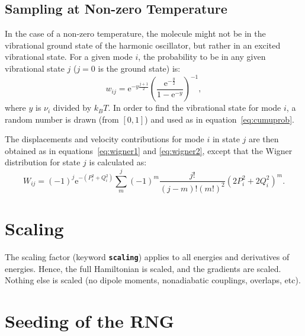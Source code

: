 \documentclass[a4paper,10pt,DIV=15,openany,twoside=false]{scrbook}
\newcommand{\todo}[1]{\textcolor{RL}{#1}}
\newcommand{\ttt}[1]{\textbf{\texttt{#1}}}
\newcommand{\E}{\ensuremath{\mathrm{e}}}
\begin{document}
\subsection{Sampling at Non-zero Temperature}


In the case of a non-zero temperature, the molecule might not be in the vibrational ground state of the harmonic oscillator, but rather in an excited vibrational state.
For a given mode $i$, the probability to be in any given vibrational state $j$ ($j=0$ is the ground state) is:
\begin{equation}
  w_{ij}=\E^{-y\frac{j+1}{2}}\left(\frac{\E^{-\frac{y}{2}}}{1-\E^{-y}}\right)^{-1},
\end{equation}
where $y$ is $\nu_i$ divided by $k_BT$.
In order to find the vibrational state for mode $i$, a random number is drawn (from $[0,1]$) and used as in equation~\eqref{eq:cumuprob}.

The displacements and velocity contributions for mode $i$ in state $j$ are then obtained as in equations~\eqref{eq:wigner1} and \eqref{eq:wigner2}, except that the Wigner distribution for state $j$ is calculated as:
\begin{equation}
  W_{ij}
  =
  (-1)^j
  \E^{-(P_i^2+Q_i^2)}
  \sum_m^j
  (-1)^m
  \frac{j!}{(j-m)!(m!)^2}
  \left(2P_i^2+2Q_i^2\right)^m.
\end{equation}





\section{Scaling}\label{met:scaling}

The scaling factor (keyword \ttt{scaling}) applies to all energies and derivatives of energies. Hence, the full Hamiltonian is scaled, and the gradients are scaled. Nothing else is scaled (no dipole moments, nonadiabatic couplings, overlaps, etc).


\section{Seeding of the RNG}\label{met:seed}
\end{document}
